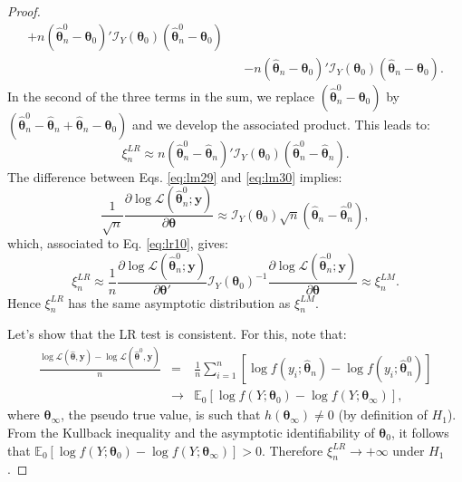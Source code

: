 \documentclass[
  11pt,
]{book}
\theoremstyle{definition}
\theoremstyle{definition}
\theoremstyle{definition}
\theoremstyle{definition}
\theoremstyle{remark}
\begin{document}
\begin{proof}
\begin{eqnarray*}
+ n (\hat{\boldsymbol\theta}^0_n-\boldsymbol\theta_0)' \mathcal{I}_Y(\boldsymbol\theta_0) (\hat{\boldsymbol\theta}^0_n-\boldsymbol\theta_0) \\
&& - n (\hat{\boldsymbol\theta}_n-\boldsymbol\theta_0)' \mathcal{I}_Y(\boldsymbol\theta_0) (\hat{\boldsymbol\theta}_n-\boldsymbol\theta_0).
\end{eqnarray*}
In the second of the three terms in the sum, we replace \((\hat{\boldsymbol\theta}^0_n-\boldsymbol\theta_0)\) by \((\hat{\boldsymbol\theta}^0_n-\hat{\boldsymbol\theta}_n+\hat{\boldsymbol\theta}_n-\boldsymbol\theta_0)\) and we develop the associated product. This leads to:
\begin{equation}
\xi_n^{LR} \approx n (\hat{\boldsymbol\theta}^0_n-\hat{\boldsymbol\theta}_n)' \mathcal{I}_Y(\boldsymbol\theta_0) (\hat{\boldsymbol\theta}^0_n-\hat{\boldsymbol\theta}_n). \label{eq:lr10}
\end{equation}
The difference between Eqs. \eqref{eq:lm29} and \eqref{eq:lm30} implies:
\[
\frac{1}{\sqrt{n}}\frac{\partial \log \mathcal{L}(\hat{\boldsymbol\theta}^0_n;\mathbf{y})}{\partial \boldsymbol\theta} \approx
\mathcal{I}_Y(\boldsymbol\theta_0)\sqrt{n}(\hat{\boldsymbol\theta}_n-\hat{\boldsymbol\theta}^0_n),
\]
which, associated to Eq. \eqref{eq:lr10}, gives:
\[
\xi_n^{LR} \approx \frac{1}{n} \frac{\partial \log \mathcal{L}(\hat{\boldsymbol\theta}^0_n;\mathbf{y})}{\partial \boldsymbol\theta'} \mathcal{I}_Y(\boldsymbol\theta_0)^{-1} \frac{\partial \log \mathcal{L}(\hat{\boldsymbol\theta}^0_n;\mathbf{y})}{\partial \boldsymbol\theta} \approx \xi_n^{LM}.
\]
Hence \(\xi_n^{LR}\) has the same asymptotic distribution as \(\xi_n^{LM}\).

Let's show that the LR test is consistent. For this, note that:
\begin{eqnarray*}
\frac{\log \mathcal{L}(\hat{\boldsymbol\theta},\mathbf{y}) - \log \mathcal{L}(\hat{\boldsymbol\theta}^0,\mathbf{y})}{n} &=& \frac{1}{n} \sum_{i=1}^n[\log f(y_i;\hat{\boldsymbol\theta}_n) - \log f(y_i;\hat{\boldsymbol\theta}_n^0)]\\
&\rightarrow& \mathbb{E}_0[\log f(Y;\boldsymbol\theta_0) - \log f(Y;\boldsymbol\theta_\infty)],
\end{eqnarray*}
where \(\boldsymbol\theta_\infty\), the pseudo true value, is such that \(h(\boldsymbol\theta_\infty) \ne 0\) (by definition of \(H_1\)). From the Kullback inequality and the asymptotic identifiability of \(\boldsymbol\theta_0\), it follows that \(\mathbb{E}_0[\log f(Y;\boldsymbol\theta_0) - \log f(Y;\boldsymbol\theta_\infty)] >0\). Therefore \(\xi_n^{LR} \rightarrow + \infty\) under \(H_1\).


\end{proof}
\end{document}
